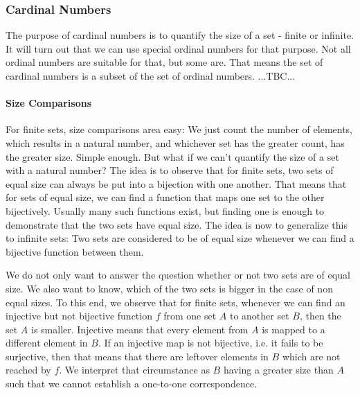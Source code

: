 



\subsubsection{Cardinal Numbers}
The purpose of cardinal numbers is to quantify the size of a set - finite or infinite. It will turn out that we can use special ordinal numbers for that purpose. Not all ordinal numbers are suitable for that, but some are. That means the set of cardinal numbers is a subset of the set of ordinal numbers. 
...TBC...

\paragraph{Size Comparisons}
For finite sets, size comparisons area easy: We just count the number of elements, which results in a natural number, and whichever set has the greater count, has the greater size. Simple enough. But what if we can't quantify the size of a set with a natural number? The idea is to observe that for finite sets, two sets of equal size can always be put into a bijection with one another. That means that for sets of equal size, we can find a function that maps one set to the other bijectively. Usually many such functions exist, but finding one is enough to demonstrate that the two sets have equal size. The idea is now to generalize this to infinite sets: Two sets are considered to be of equal size whenever we can find a bijective function between them.

\medskip
We do not only want to answer the question whether or not two sets are of equal size. We also want to know, which of the two sets is bigger in the case of non equal sizes. To this end, we observe that for finite sets, whenever we can find an injective but not bijective function $f$ from one set $A$ to another set $B$, then the set $A$ is smaller. Injective means that every element from $A$ is mapped to a different element in $B$. If an injective map is not bijective, i.e. it fails to be surjective, then that means that there are leftover elements in $B$ which are not reached by $f$. We interpret that circumstance as $B$ having a greater size than $A$ such that we cannot establish a one-to-one correspondence. 

